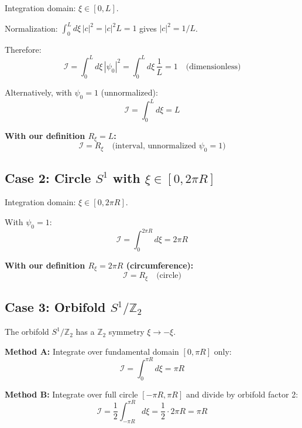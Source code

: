 \documentclass[11pt,a4paper]{article}
\newcommand{\Rxi}{R_\xi}
\newcommand{\calI}{\mathcal{I}}
\begin{document}
Integration domain: $\xi \in [0,L]$.

Normalization: $\int_0^L d\xi\, |c|^2 = |c|^2 L = 1$ gives $|c|^2 = 1/L$.

Therefore:
\begin{equation}
\calI = \int_0^L d\xi\, |\psi_0|^2 = \int_0^L d\xi\, \frac{1}{L} = 1 \quad \text{(dimensionless)}
\label{eq:I-interval-norm}
\end{equation}

Alternatively, with $\psi_0 = 1$ (unnormalized):
\begin{equation}
\calI = \int_0^L d\xi = L
\label{eq:I-interval-unnorm}
\end{equation}

\textbf{With our definition $\Rxi = L$:}
\begin{equation}
\calI = \Rxi \quad \text{(interval, unnormalized $\psi_0 = 1$)}
\label{eq:I-Rxi-interval}
\end{equation}

\subsection{Case 2: Circle $S^1$ with $\xi \in [0, 2\pi R]$}

Integration domain: $\xi \in [0, 2\pi R]$.

With $\psi_0 = 1$:
\begin{equation}
\calI = \int_0^{2\pi R} d\xi = 2\pi R
\label{eq:I-circle}
\end{equation}

\textbf{With our definition $\Rxi = 2\pi R$ (circumference):}
\begin{equation}
\calI = \Rxi \quad \text{(circle)}
\label{eq:I-Rxi-circle}
\end{equation}

\subsection{Case 3: Orbifold $S^1/\mathbb{Z}_2$}

The orbifold $S^1/\mathbb{Z}_2$ has a $\mathbb{Z}_2$ symmetry $\xi \to -\xi$.

\textbf{Method A:} Integrate over fundamental domain $[0, \pi R]$ only:
\begin{equation}
\calI = \int_0^{\pi R} d\xi = \pi R
\label{eq:I-orbifold-fund}
\end{equation}

\textbf{Method B:} Integrate over full circle $[-\pi R, \pi R]$ and divide by
orbifold factor 2:
\begin{equation}
\calI = \frac{1}{2} \int_{-\pi R}^{\pi R} d\xi = \frac{1}{2} \cdot 2\pi R = \pi R
\label{eq:I-orbifold-full}
\end{equation}
\end{document}
